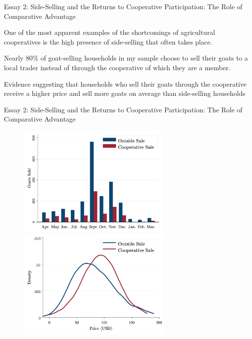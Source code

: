 \documentclass[aspectratio=169]{beamer}
\newenvironment{wideitemize}{\itemize\addtolength{\itemsep}{10pt}}{\enditemize}
\begin{document}
\begin{frame}{Essay 2: Side-Selling and the Returns to Cooperative Participation: The Role of Comparative Advantage}

    \begin{wideitemize}
        \item One of the most apparent examples of the shortcomings of agricultural cooperatives is the high presence of side-selling that often takes place. 
        \item Nearly 80\% of goat-selling households in my sample choose to sell their goats to a local trader instead of through the cooperative of which they are a member. \vspace{.25cm}
         \begin{wideitemize}
             \item Evidence suggesting that households who sell their goats through the cooperative receive a higher price and sell more goats on average than side-selling households
         \end{wideitemize}
    \end{wideitemize}
\end{frame}

\begin{frame}{Essay 2: Side-Selling and the Returns to Cooperative Participation: The Role of Comparative Advantage}
\begin{figure}[!h]
  \label{fig:app}
  \hspace{-1.2cm}
  \begin{minipage}{.45\textwidth}
    \includegraphics[width=7.6cm,trim=4 4 4 4,clip]{E2_SaleMonth.png}
  \end{minipage}
  \hspace{.5cm}
  \begin{minipage}{.45\textwidth}
  \vspace{.45cm}
    \includegraphics[width=7.6cm,trim=4 4 4 4,clip]{E2_PriceDensity_Annual.png}
  \end{minipage}
\end{figure}
\end{frame}
\end{document}

